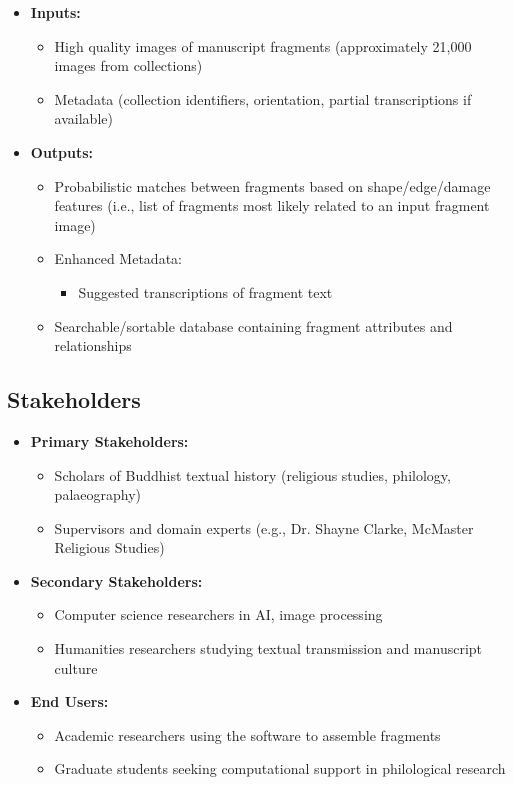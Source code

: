 \documentclass{article}
\begin{document}
\begin{itemize}
  \item \textbf{Inputs:}
    \begin{itemize}
      \item High quality images of manuscript fragments (approximately 21{,}000 images from collections)
      \item Metadata (collection identifiers, orientation, partial transcriptions if available)
    \end{itemize}

  \item \textbf{Outputs:}
    \begin{itemize}
      \item Probabilistic matches between fragments based on shape/edge/damage features (i.e., list of fragments most likely related to an input fragment image)
      \item Enhanced Metadata:
        \begin{itemize}
          \item Suggested transcriptions of fragment text
        \end{itemize}
      \item Searchable/sortable database containing fragment attributes and relationships
    \end{itemize}
\end{itemize}


\subsection{Stakeholders}
\begin{itemize}
    \item \textbf{Primary Stakeholders:}
    \begin{itemize} 
        \item Scholars of Buddhist textual history (religious studies, philology, palaeography)
        \item Supervisors and domain experts (e.g., Dr. Shayne Clarke, McMaster Religious Studies)
    \end{itemize}

    \item \textbf{Secondary Stakeholders:}
    \begin{itemize} 
        \item Computer science researchers in AI, image processing
        \item Humanities researchers studying textual transmission and manuscript culture

    \end{itemize}
    
    \item \textbf{End Users:}
    \begin{itemize} 
        \item Academic researchers using the software to assemble fragments
        \item Graduate students seeking computational support in philological research
    \end{itemize}
\end{itemize}
\end{document}
